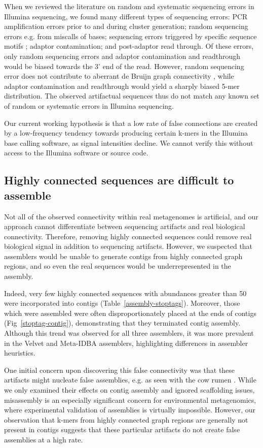 \documentclass[10pt]{article}
\begin{document}
When we reviewed the literature on random and systematic sequencing
errors in Illumina sequencing, we found many different types of
sequencing errors: PCR amplification errors prior to and during
cluster generation; random sequencing errors e.g. from miscalls of
bases; sequencing errors triggered by specific sequence motifs
\cite{Meacham:2011}; adaptor contamination; and post-adaptor read
through.  Of these errors, only random sequencing errors and adaptor
contamination and readthrough would be biased towards the 3' end of
the read.  However, random sequencing error does not contribute to
aberrant de Bruijn graph connectivity \cite{Pell:2012cq}, while
adaptor contamination and readthrough would yield a sharply biased
5-mer distribution.  The observed artifactual sequences thus do not match
any known set of random or systematic errors in Illumina sequencing.

Our current working hypothesis is that a low rate of false connections
are created by a low-frequency tendency towards producing certain
k-mers in the Illumina base calling software, as signal intensities
decline.  We cannot verify this without access to the Illumina
software or source code.

\subsection*{Highly connected sequences are difficult to assemble}

Not all of the observed connectivity within real metagenomes is
artificial, and our approach cannot differentiate between sequencing
artifacts and real biological connectivity.  Therefore, removing
highly connected sequences could remove real biological signal in
addition to sequencing artifacts.  However, we suspected that
assemblers would be unable to generate contigs from highly connected
graph regions, and so even the real sequences would be
underrepresented in the assembly.

Indeed, very few highly connected sequences with abundances greater
than 50 were incorporated into contigs (Table~\ref{assembly-stoptags}). Moreover, those
which were assembled were often disproportionately placed at the ends
of contigs (Fig~\ref{stoptag-contig}), demonstrating that they terminated contig
assembly.  Although this trend was observed for all three assemblers,
it was more prevalent in the Velvet and Meta-IDBA assemblers,
highlighting differences in assembler heuristics.

One initial concern upon discovering this false connectivity was that
these artifacts might nucleate false assemblies, e.g. as seen with the cow
rumen \cite{Hess:2011p686}.  While we only examined their effects on
contig assembly and ignored scaffolding issues, misassembly is an
especially significant concern for environmental metagenomics, where
experimental validation of assemblies is virtually impossible.
However, our observation that k-mers from highly connected graph
regions are generally not present in contigs suggests that these
particular artifacts do not create false assemblies at a high rate.
\end{document}
